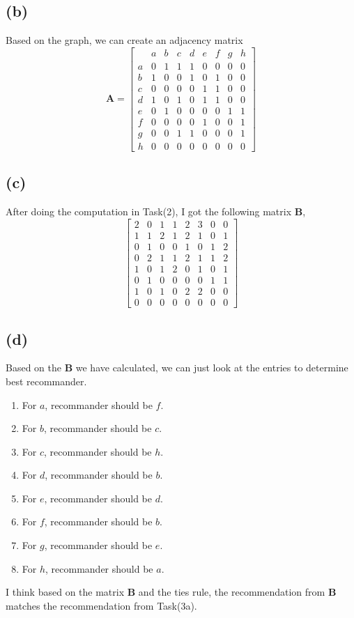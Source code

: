 \documentclass{article}
\newcommand{\mat}[1]{\mathbf{#1}}
\begin{document}
\subsection*{(b)}
Based on the graph, we can create an adjacency matrix 
$$\mat{A} = \begin{bmatrix}
    \ & a & b & c & d & e & f & g & h \\
    a & 0 & 1 & 1 & 1 & 0 & 0 & 0 & 0 \\
    b & 1 & 0 & 0 & 1 & 0 & 1 & 0 & 0 \\
    c & 0 & 0 & 0 & 0 & 1 & 1 & 0 & 0 \\
    d & 1 & 0 & 1 & 0 & 1 & 1 & 0 & 0 \\
    e & 0 & 1 & 0 & 0 & 0 & 0 & 1 & 1 \\
    f & 0 & 0 & 0 & 0 & 1 & 0 & 0 & 1 \\
    g & 0 & 0 & 1 & 1 & 0 & 0 & 0 & 1 \\
    h & 0 & 0 & 0 & 0 & 0 & 0 & 0 & 0 
\end{bmatrix}
$$
\subsection*{(c)}
After doing the computation in Task(2), I got the following matrix $\mat{B}$,
$$\begin{bmatrix}
2& 0 &1& 1& 2& 3& 0& 0\\
1& 1& 2& 1& 2& 1& 0& 1\\
0& 1& 0& 0& 1& 0& 1& 2\\
0& 2& 1& 1& 2& 1& 1& 2\\
1& 0& 1& 2& 0& 1& 0& 1\\
0& 1& 0& 0& 0& 0& 1& 1\\
1& 0& 1& 0& 2& 2& 0& 0\\
0& 0& 0& 0& 0& 0& 0& 0
\end{bmatrix}$$
\subsection*{(d)}
Based on the $\mat{B}$ we have calculated, we can just look
at the entries to determine best recommander.
\begin{enumerate}
    \item For $a$, recommander should be $f$.
    \item For $b$, recommander should be $c$.
    \item For $c$, recommander should be $h$.
    \item For $d$, recommander should be $b$.
    \item For $e$, recommander should be $d$.
    \item For $f$, recommander should be $b$.
    \item For $g$, recommander should be $e$.
    \item For $h$, recommander should be $a$.
\end{enumerate}
I think based on the matrix $\mat{B}$ and the ties rule, the recommendation from $\mat{B}$
matches the recommendation from Task(3a).
\end{document}
